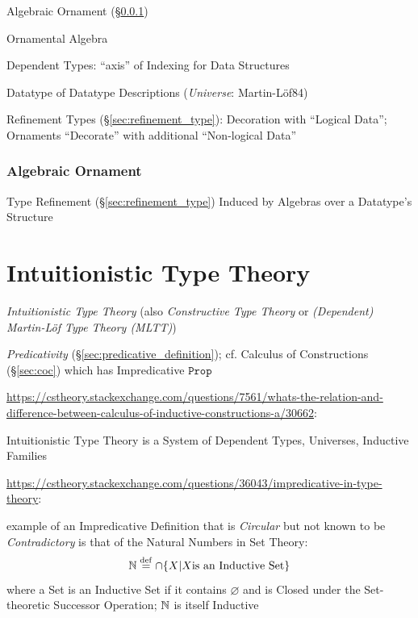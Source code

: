 \cite{mcbride13}

Algebraic Ornament (\S\ref{sec:algebraic_ornament})

Ornamental Algebra

Dependent Types: ``axis'' of Indexing for Data Structures

Datatype of Datatype Descriptions (\emph{Universe}: Martin-L\"of84)

Refinement Types (\S\ref{sec:refinement_type}): Decoration with
``Logical Data''; Ornaments ``Decorate'' with additional ``Non-logical
Data'' %



\subsubsection{Algebraic Ornament}\label{sec:algebraic_ornament}

Type Refinement (\S\ref{sec:refinement_type}) Induced by Algebras over
a Datatype's Structure



\section{Intuitionistic Type Theory}\label{sec:intuitionistic_type}

\cite{martinlof84}

\emph{Intuitionistic Type Theory} (also \emph{Constructive Type Theory} or
\emph{(Dependent) Martin-L\"of Type Theory (MLTT)})

\emph{Predicativity} (\S\ref{sec:predicative_definition}); cf. Calculus of
Constructions (\S\ref{sec:coc}) which has Impredicative $\mathtt{Prop}$

\url{https://cstheory.stackexchange.com/questions/7561/whats-the-relation-and-difference-between-calculus-of-inductive-constructions-a/30662}:

Intuitionistic Type Theory is a System of Dependent Types, Universes, Inductive
Families

\url{https://cstheory.stackexchange.com/questions/36043/impredicative-in-type-theory}:

example of an Impredicative Definition that is \emph{Circular} but not known to
be \emph{Contradictory} is that of the Natural Numbers in Set Theory:
\[
  \mathbb{N} \stackrel{\mathrm{def}}= \cap\{ X | X \text{is an Inductive Set} \}
\]
where a Set is an Inductive Set if it contains $\varnothing$ and is Closed under
the Set-theoretic Successor Operation; $\mathbb{N}$ is itself Inductive

